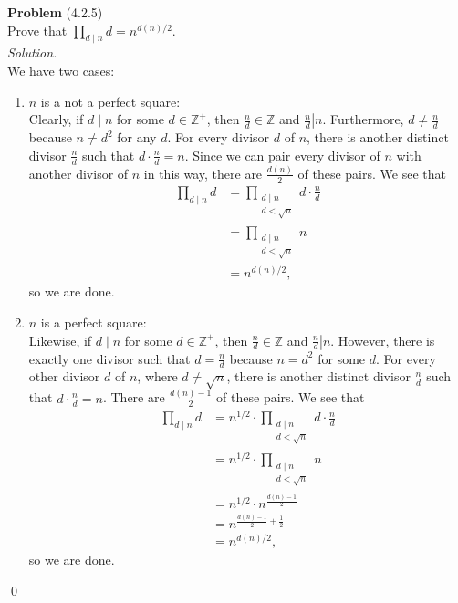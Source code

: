 \documentclass[12 pt]{amsart}
\begin{document}
\phantom{\quad} \vfill
\noindent
\textbf{Problem} (4.2.5) \\[4ex]
  Prove that $\prod_{d \mid n} d = n^{d(n)/2}$. 
  \\[2ex]
\emph{Solution.} \\[2ex]
  We have two cases:
  \begin{enumerate}
    \item $n$ is a not a perfect square: \\
      Clearly, if $d \mid n$ for some $d \in \mathbb{Z}^+$, then
      $\frac{n}{d} \in \mathbb{Z}$ and 
      $\left. \frac{n}{d} \right| n$.
      Furthermore, $d \neq \frac{n}{d}$ because $n \neq d^2$ for any $d$.
      For every divisor $d$ of $n$, there is another distinct divisor 
      $\frac{n}{d}$ such that 
      $d \cdot \frac{n}{d} = n$.
      Since we can pair every divisor of $n$ with another divisor
      of $n$ in this way,
      there are $\frac{d(n)}{2}$ of these pairs.
      We see that 
      \begin{align*}
        \prod_{d \mid n} d 
        &= \prod_{\substack{d \mid n \\ d < \sqrt{n}}} d \cdot \frac{n}{d}\\
        &= \prod_{\substack{d \mid n \\ d < \sqrt{n}}} n \\
        &= n^{d(n)/2},
      \end{align*}
      so we are done.
    \item $n$ is a perfect square: \\
      Likewise, if $d \mid n$ for some $d \in \mathbb{Z}^+$, then
      $\frac{n}{d} \in \mathbb{Z}$ and 
      $\left. \frac{n}{d} \right| n$.
      However, there is exactly one divisor such that $d = \frac{n}{d}$
      because $n = d^2$ for some $d$.
      For every other divisor $d$ of $n$, where $d \neq \sqrt{n}$,
      there is another distinct divisor 
      $\frac{n}{d}$ such that 
      $d \cdot \frac{n}{d} = n$.
      There are $\frac{d(n) - 1}{2}$ of these pairs.
      We see that 
      \begin{align*}
        \prod_{d \mid n} d 
        &= n^{1/2} \cdot
           \prod_{\substack{d \mid n \\ d < \sqrt{n}}} d \cdot \frac{n}{d} \\
        &= n^{1/2} \cdot\prod_{\substack{d \mid n \\ d < \sqrt{n}}} n \\
        &= n^{1/2} \cdot n^{\frac{d(n) - 1}{2}} \\
        &= n^{\frac{d(n) - 1}{2} + \frac{1}{2}}  \\
        &= n^{d(n)/2},
      \end{align*}
      so we are done.
  \end{enumerate}
  \qed
\vfill
\newpage
\end{document}
